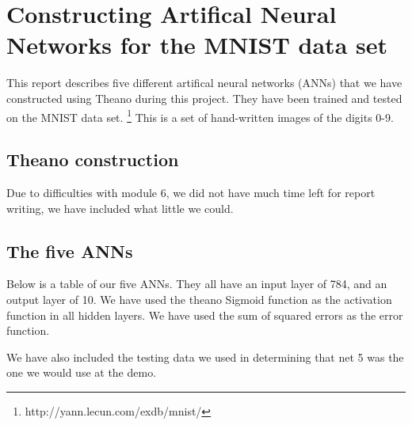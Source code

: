 
\section{Constructing Artifical Neural Networks for the MNIST data set}
This report describes five different artifical neural networks (ANNs)
that we have constructed using Theano during this project. They have
been trained and tested on the MNIST data set.
\footnote{http://yann.lecun.com/exdb/mnist/} This is a set of
hand-written images of the digits 0-9.

\subsection{Theano construction}

Due to difficulties with module 6, we did not have much time left for report
writing, we have included what little we could.

\subsection{The five ANNs}


Below is a table of our five ANNs. They all have an input layer of 784, and
an output layer of 10. We have used the theano Sigmoid function as the
activation function in all hidden layers. We have used the sum of squared
errors as the error function.

We have also included the testing data we used in determining that net 5
was the one we would use at the demo.

